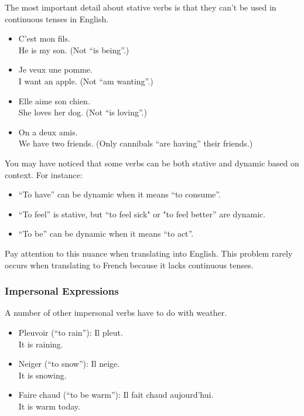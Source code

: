 The most important detail about stative verbs is that they can't be used in continuous tenses in English.

\begin{itemize}
  \item  C'est mon fils. \\ He is my son. (Not ``is being''.)
  \item  Je veux une pomme. \\ I want an apple. (Not ``am wanting''.)
  \item  Elle aime son chien. \\  She loves her dog. (Not ``is loving''.) 
  \item  On a deux amis. \\ We have two friends. (Only cannibals ``are having'' their friends.)
\end{itemize}

You may have noticed that some verbs can be both stative and dynamic based on context. For instance:

\begin{itemize}
  \item  ``To have'' can be dynamic when it means ``to consume''.
  \item  ``To feel'' is stative, but ``to feel sick" or "to feel better'' are dynamic.
  \item  ``To be'' can be dynamic when it means ``to act''.
\end{itemize}

Pay attention to this nuance when translating into English. This problem rarely occurs when translating to French because it lacks continuous tenses. 

\subsubsection{Impersonal Expressions}

A number of other impersonal verbs have to do with weather.

\begin{itemize}
  \item  Pleuvoir (``to rain''): Il pleut. \\ It is raining.
  \item  Neiger (``to snow''): Il neige. \\ It is snowing.
  \item  Faire chaud (``to be warm''): Il fait chaud aujourd'hui. \\ It is warm today.
\end{itemize}

